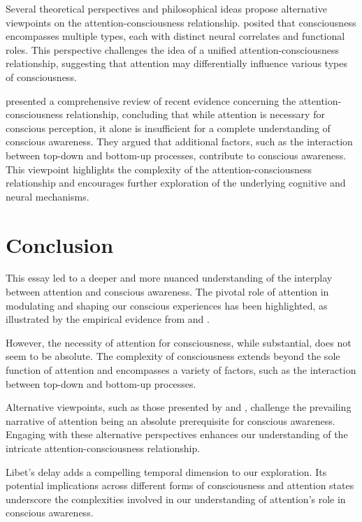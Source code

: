 \documentclass[10pt]{article}
\begin{document}
\begin{sloppypar}
  Several theoretical perspectives and philosophical ideas propose alternative viewpoints on the attention-consciousness relationship. \cite{montemayor_types_2021} posited that consciousness encompasses multiple types, each with distinct neural correlates and functional roles. This perspective challenges the idea of a unified attention-consciousness relationship, suggesting that attention may differentially influence various types of consciousness.

  \cite{noah_recent_2020} presented a comprehensive review of recent evidence concerning the attention-consciousness relationship, concluding that while attention is necessary for conscious perception, it alone is insufficient for a complete understanding of conscious awareness. They argued that additional factors, such as the interaction between top-down and bottom-up processes, contribute to conscious awareness. This viewpoint highlights the complexity of the attention-consciousness relationship and encourages further exploration of the underlying cognitive and neural mechanisms.

  \section{Conclusion}
  \label{sec:conclusion}

  This essay led to a deeper and more nuanced understanding of the interplay between attention and conscious awareness. The pivotal role of attention in modulating and shaping our conscious experiences has been highlighted, as illustrated by the empirical evidence from \cite{cohen_attentional_2012} and \cite{kentridge_spatial_2004}.

  However, the necessity of attention for consciousness, while substantial, does not seem to be absolute. The complexity of consciousness extends beyond the sole function of attention and encompasses a variety of factors, such as the interaction between top-down and bottom-up processes.

  Alternative viewpoints, such as those presented by \cite{aru_phenomenal_2013} and \cite{kentridge_attended_2008}, challenge the prevailing narrative of attention being an absolute prerequisite for conscious awareness. Engaging with these alternative perspectives enhances our understanding of the intricate attention-consciousness relationship.

  Libet’s delay adds a compelling temporal dimension to our exploration. Its potential implications across different forms of consciousness and attention states underscore the complexities involved in our understanding of attention’s role in conscious awareness.


\end{sloppypar}
\end{document}
